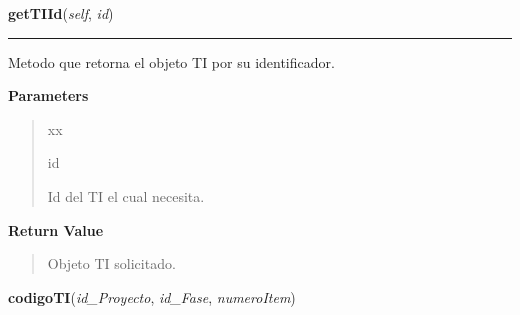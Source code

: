 \hspace{.8\funcindent}\begin{boxedminipage}{\funcwidth}

    \raggedright \textbf{getTIId}(\textit{self}, \textit{id})

    \vspace{-1.5ex}

    \rule{\textwidth}{0.5\fboxrule}
\setlength{\parskip}{2ex}
    Metodo que retorna el objeto TI por su identificador.

\setlength{\parskip}{1ex}
      \textbf{Parameters}
      \vspace{-1ex}

      \begin{quote}
        \begin{Ventry}{xx}

          \item[id]

          Id del TI el cual necesita.

        \end{Ventry}

      \end{quote}

      \textbf{Return Value}
    \vspace{-1ex}

      \begin{quote}
      Objeto TI solicitado.

      \end{quote}

    \end{boxedminipage}

    \label{app:controlador:contItem:ControllerTI:codigoTI}

    \vspace{0.5ex}

\hspace{.8\funcindent}\begin{boxedminipage}{\funcwidth}

    \raggedright \textbf{codigoTI}(\textit{id\_Proyecto}, \textit{id\_Fase}, \textit{numeroItem})

\setlength{\parskip}{2ex}
\setlength{\parskip}{1ex}
    \end{boxedminipage}

